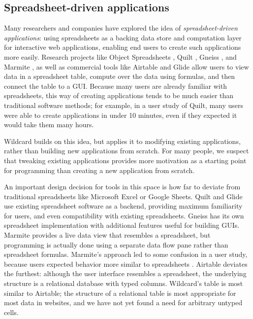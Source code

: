 \documentclass[english,submission]{programming}
\begin{document}
\hypertarget{spreadsheet-driven-applications}{%
\subsection{Spreadsheet-driven
applications}\label{spreadsheet-driven-applications}}

Many researchers and companies have explored the idea of
\emph{spreadsheet-driven applications}: using spreadsheets as a backing
data store and computation layer for interactive web applications,
enabling end users to create such applications more easily. Research
projects like Object Spreadsheets \autocite{mccutchen2016}, Quilt
\autocite{benson2014}, Gneiss \autocite{chang2014}, and Marmite
\autocite{wong2007}, as well as commercial tools like Airtable
\autocite{zotero-79} and Glide \autocite{zotero-81} allow users to view
data in a spreadsheet table, compute over the data using formulas, and
then connect the table to a GUI. Because many users are already familiar
with spreadsheets, this way of creating applications tends to be much
easier than traditional software methods; for example, in a user study
of Quilt, many users were able to create applications in under 10
minutes, even if they expected it would take them many hours.

Wildcard builds on this idea, but applies it to modifying existing
applications, rather than building new applications from scratch. For
many people, we suspect that tweaking existing applications provides
more motivation as a starting point for programming than creating a new
application from scratch.

An important design decision for tools in this space is how far to
deviate from traditional spreadsheets like Microsoft Excel or Google
Sheets. Quilt and Glide use existing spreadsheet software as a backend,
providing maximum familiarity for users, and even compatibility with
existing spreadsheets. Gneiss has its own spreadsheet implementation
with additional features useful for building GUIs. Marmite provides a
live data view that resembles a spreadsheet, but programming is actually
done using a separate data flow pane rather than spreadsheet formulas.
Marmite's approach led to some confusion in a user study, because users
expected behavior more similar to spreadsheets \autocite{wong2007}.
Airtable deviates the furthest: although the user interface resembles a
spreadsheet, the underlying structure is a relational database with
typed columns. Wildcard's table is most similar to Airtable; the
structure of a relational table is most appropriate for most data in
websites, and we have not yet found a need for arbitrary untyped cells.
\end{document}
